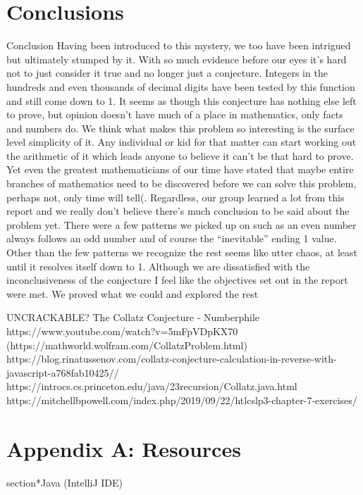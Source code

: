 \documentclass[10pt,english, openany]{book}
\begin{document}
\chapter{Conclusions}
Conclusion
        	Having been introduced to this mystery, we too have been intrigued but ultimately stumped by it. With so much evidence before our eyes it’s hard not to just consider it true and no longer just a conjecture. Integers in the hundreds and even thousands of decimal digits have been tested by this function and still come down to 1. It seems as though this conjecture has nothing else left to prove, but opinion doesn’t have much of a place in mathematics, only facts and numbers do. We think what makes this problem so interesting is the surface level simplicity of it. Any individual or kid for that matter can start working out the arithmetic of it which leads anyone to believe it can’t be that hard to prove. Yet even the greatest mathematicians of our time have stated that maybe entire branches of mathematics need to be discovered before we can solve this problem, perhaps not, only time will tell(. Regardless, our group learned a lot from this report and we really don’t believe there’s much conclusion to be said about the problem yet. There were a few patterns we picked up on such as an even number always follows an odd number and of course the “inevitable” ending 1 value. Other than the few patterns we recognize the rest seems like utter chaos, at least until it resolves itself down to 1. Although we are dissatisfied with the inconclusiveness of the conjecture I feel like the objectives set out in the report were met. We proved what we could and explored the rest

\pagebreak




UNCRACKABLE? The Collatz Conjecture - Numberphile\\
https://www.youtube.com/watch?v=5mFpVDpKX70\\
(https://mathworld.wolfram.com/CollatzProblem.html)\\
https://blog.rinatussenov.com/collatz-conjecture-calculation-in-reverse-with-javascript-a768fab10425//
https://introcs.cs.princeton.edu/java/23recursion/Collatz.java.html\\
https://mitchellbpowell.com/index.php/2019/09/22/htlcslp3-chapter-7-exercises/\\



\pagebreak

\chapter*{Appendix A: Resources}
section*{Java (IntelliJ IDE)}
\end{document}
